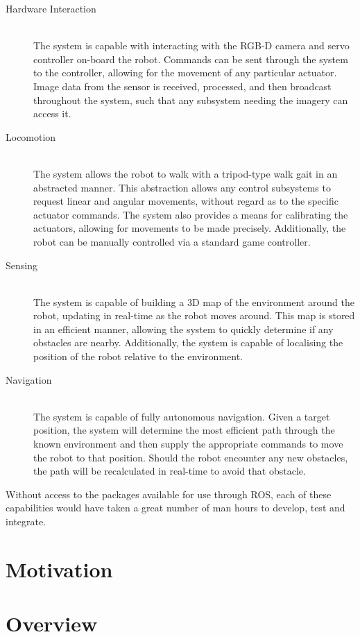 \begin{description}
	\item[Hardware Interaction] \hfill \\
	The system is capable with interacting with the RGB-D camera and servo controller on-board the robot. Commands can be sent through the system to the controller, allowing for the movement of any particular actuator. Image data from the sensor is received, processed, and then broadcast throughout the system, such that any subsystem needing the imagery can access it.

	\item[Locomotion] \hfill \\
	The system allows the robot to walk with a tripod-type walk gait in an abstracted manner. This abstraction allows any control subsystems to request linear and angular movements, without regard as to the specific actuator commands. The system also provides a means for calibrating the actuators, allowing for movements to be made precisely. Additionally, the robot can be manually controlled via a standard game controller.

	\item[Sensing] \hfill \\
	The system is capable of building a 3D map of the environment around the robot, updating in real-time as the robot moves around. This map is stored in an efficient manner, allowing the system to quickly determine if any obstacles are nearby. Additionally, the system is capable of localising the position of the robot relative to the environment.

	\item[Navigation] \hfill \\
	The system is capable of fully autonomous navigation. Given a target position, the system will determine the most efficient path through the known environment and then supply the appropriate commands to move the robot to that position. Should the robot encounter any new obstacles, the path will be recalculated in real-time to avoid that obstacle.

\end{description}

Without access to the packages available for use through ROS, each of these capabilities would have taken a great number of man hours to develop, test and integrate. 

\section{Motivation}

\section{Overview}